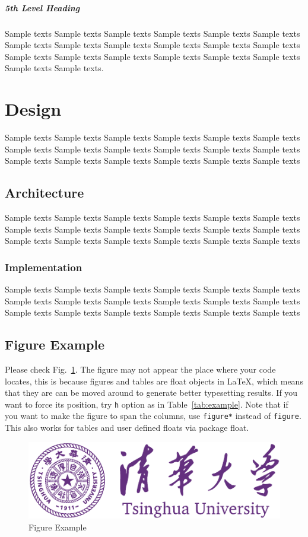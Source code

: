 \documentclass{ics}
\begin{document}
\subparagraph{5th Level Heading}
\label{sec:5th-level-heading}
Sample texts Sample texts Sample texts Sample texts Sample texts Sample texts
Sample texts Sample texts Sample texts Sample texts Sample texts Sample texts
Sample texts Sample texts Sample texts Sample texts Sample texts Sample texts
Sample texts Sample texts.

\section{Design}
\label{sec:design}
Sample texts Sample texts Sample texts Sample texts Sample texts Sample texts
Sample texts Sample texts Sample texts Sample texts Sample texts Sample texts
Sample texts Sample texts Sample texts Sample texts Sample texts Sample texts

\subsection{Architecture}
\label{sec:architecture}
Sample texts Sample texts Sample texts Sample texts Sample texts Sample texts
Sample texts Sample texts Sample texts Sample texts Sample texts Sample texts
Sample texts Sample texts Sample texts Sample texts Sample texts Sample texts

\subsubsection{Implementation}
\label{sec:implementation}
Sample texts Sample texts Sample texts Sample texts Sample texts Sample texts
Sample texts Sample texts Sample texts Sample texts Sample texts Sample texts
Sample texts Sample texts Sample texts Sample texts Sample texts Sample texts

\subsection{Figure Example}
\label{sec:figure-example}
Please check Fig.~\ref{fig:example}. The figure may not appear the place where
your code locates, this is because figures and tables are float objects in
\LaTeX, which means that they are can be moved around to generate better
typesetting results. If you want to force its position, try \texttt{h} option as
in Table~\ref{tab:example}. Note that if you want to make the figure to span the
columns, use \texttt{figure*} instead of \texttt{figure}. This also works for
tables and user defined floats via package \textsf{float}.

\begin{figure}
  \centering
  \includegraphics[width=.8\linewidth]{thu-whole-logo}
  \caption{Figure Example}
  \label{fig:example}
\end{figure}
\end{document}
